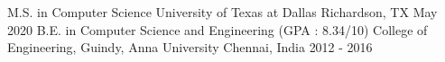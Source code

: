 

\begin{cventries}

  \cventry
    {M.S. in Computer Science} %
    {University of Texas at Dallas} %
    {Richardson, TX} %
    {May 2020} %
    {
    }
  \cventry
    {B.E. in Computer Science and Engineering  (GPA : 8.34/10)} %
    {College of Engineering, Guindy, Anna University} %
    {Chennai, India} %
    {2012 - 2016} %
    {
    }
\end{cventries}
